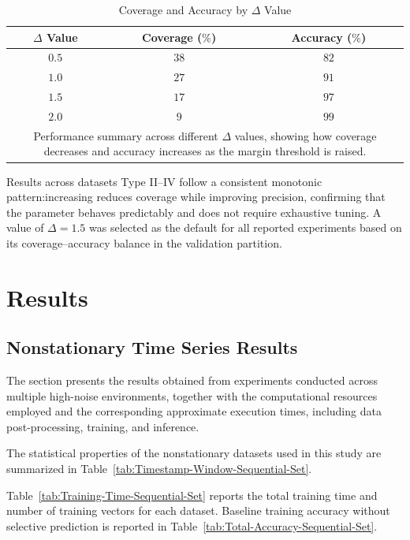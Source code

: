 \documentclass[conference]{IEEEtran}
\begin{document}
\begin{table}[H]
    \centering
    \caption{Coverage and Accuracy by $\Delta$ Value}
    \label{tab:coverage-accuracy-delta}
    \begin{tabular}{c c c}
        \hline
        $\Delta$ Value & Coverage ($\%$) & Accuracy ($\%$)\\
        \hline
        $0.5$ & $38$ & $82$\\
        $1.0$ & $27$ & $91$\\
        $1.5$ & $17$ & $97$\\
        $2.0$ & $9$  & $99$\\
        \hline
        \multicolumn{3}{p{0.9\linewidth}}{\centering
        Performance summary across different $\Delta$ values, showing how coverage decreases and accuracy increases as the margin threshold is raised.
        }
    \end{tabular}
\end{table}

Results across datasets Type II–IV follow a consistent monotonic pattern:increasing  reduces coverage while improving precision, confirming that the parameter behaves predictably and does not require exhaustive tuning. A value of  $\Delta = 1.5$ was selected as the default for all reported experiments based on its coverage–accuracy balance in the validation partition.

\section{Results}

\subsection{Nonstationary Time Series Results}

The section presents the results obtained from experiments conducted across multiple high-noise environments, together with the computational resources employed and the corresponding approximate execution times, including data post-processing, training, and inference. 

The statistical properties of the nonstationary datasets used in this study are summarized in Table~\ref{tab:Timestamp-Window-Sequential-Set}. 

Table~\ref{tab:Training-Time-Sequential-Set} reports the total training time and number of training vectors for each dataset. Baseline training accuracy without selective prediction is reported in Table~\ref{tab:Total-Accuracy-Sequential-Set}. 
\end{document}
